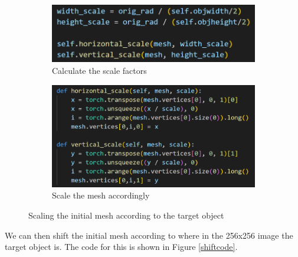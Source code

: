 \documentclass{article}
\begin{document}
\begin{figure}[h!]
  \centering
  \begin{subfigure}{0.55\textwidth}
    \centering
    \includegraphics[width=\textwidth]{images/scale_a.png}
    \caption{Calculate the scale factors}
  \end{subfigure}
  \hfill
  \begin{subfigure}{0.4\textwidth}
    \centering
    \includegraphics[width=\textwidth]{images/scale_b.png}
    \caption{Scale the mesh accordingly}
  \end{subfigure}
  \caption{Scaling the initial mesh according to the target object}
  \label{scalecode}
\end{figure}

We can then shift the initial mesh according to where in the 256x256 image the target object is. The code for this is shown in Figure \ref{shiftcode}.
\end{document}
